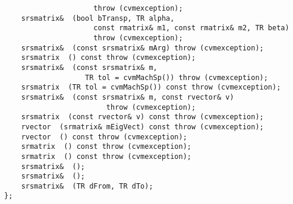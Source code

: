 \verb"                     throw (cvmexception);"\\
\verb"    srsmatrix& "\verb" (bool bTransp, TR alpha,"\\
\verb"                     const rmatrix& m1, const rmatrix& m2, TR beta)"\\
\verb"                     throw (cvmexception);"\\
\verb"    srsmatrix& "\verb" (const srsmatrix& mArg) throw (cvmexception);"\\
\verb"    srsmatrix "\verb" () const throw (cvmexception);"\\
\verb"    srsmatrix& "\verb" (const srsmatrix& m,"\\
\verb"                   TR tol = cvmMachSp()) throw (cvmexception);"\\
\verb"    srsmatrix "\verb" (TR tol = cvmMachSp()) const throw (cvmexception);"\\
\verb"    srsmatrix& "\verb" (const srsmatrix& m, const rvector& v)"\\
\verb"                        throw (cvmexception);"\\
\verb"    srsmatrix "\verb" (const rvector& v) const throw (cvmexception);"\\
\verb"    rvector "\verb" (srmatrix& mEigVect) const throw (cvmexception);"\\
\verb"    rvector "\verb" () const throw (cvmexception);"\\
\verb"    srmatrix "\verb" () const throw (cvmexception);"\\
\verb"    srmatrix "\verb" () const throw (cvmexception);"\\
\verb"    srsmatrix& "\verb" ();"\\
\verb"    srsmatrix& "\verb" ();"\\
\verb"    srsmatrix& "\verb" (TR dFrom, TR dTo);"\\
\verb"};"
\newpage



